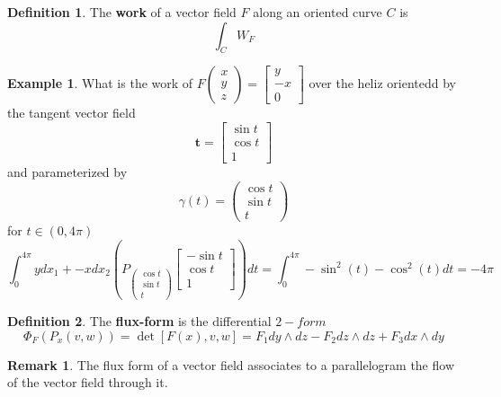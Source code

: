 \documentclass[10pt, oneside]{article}
\theoremstyle{definition}
\newtheorem{exmp}{Example}[section]
\newtheorem{defn}{Definition}
\newtheorem{rem}{Remark}
\begin{document}
\begin{defn}
    The \textbf{work} of a vector field $F$ along an oriented curve $C$ is 
    \[\int_C W_F\]
\end{defn}

\begin{exmp}
    What is the work of $F\begin{pmatrix}
        x \\ y\\z
    \end{pmatrix} = \begin{bmatrix}
        y\\ -x \\0
    \end{bmatrix}$ over the heliz orientedd by the tangent vector field 
    \[\textbf{t} = \begin{bmatrix}
        \sin t\\
        \cos t\\
        1
    \end{bmatrix}\] and parameterized by 
    \[\gamma(t) = \begin{pmatrix}
        \cos t\\ \sin t \\t
    \end{pmatrix}\] for $t \in (0,4\pi)$
    \[\int_0^{4\pi} ydx_1 + -xdx_2\left(P_{\begin{pmatrix}
        \cos t\\ \sin t \\t
    \end{pmatrix}}\begin{bmatrix}
        -\sin t\\ \cos t\\
        1
    \end{bmatrix}\right) dt = \int_0^{4\pi} -\sin^2(t) - \cos^2(t)dt = -4\pi\]
\end{exmp}


\begin{defn}
    The \textbf{flux-form} is the differential $2-form$ 
    \[\Phi_F(P_x(v, w)) = \det[F(x), v, w] = F_1 dy \wedge dz - F_2 dz \wedge dz + F_3 dx \wedge dy\]
\end{defn}
\begin{rem}
    The flux form of a vector field associates to a parallelogram the flow of the vector field through it.
\end{rem}
\end{document}
